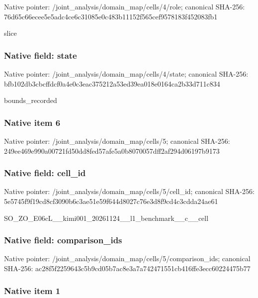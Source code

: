 \documentclass[10pt,a4paper]{article}
\begin{document}
Native pointer: /joint\_analysis/domain\_map/cells/4/role; canonical SHA-256: 76d65c66ecee5e5adc4ce6c3\allowbreak{}1085e0c483b11152f565cef9\allowbreak{}578183f452083fb1


slice


\subsubsection{Native field: state}


Native pointer: /joint\_analysis/domain\_m\allowbreak{}ap/cells/4/state; canonical SHA-256: bfb102db3cbcffdcf0a4e0c3\allowbreak{}eac375212a53ed39ea018e01\allowbreak{}64ca2b33d711c834


bounds\_recorded


\subsubsection{Native item 6}


Native pointer: /joint\_analysis/domain\_map/cells/5; canonical SHA-256: 249ee469e990a00721fd50dd\allowbreak{}8fed57afe5a0b8070057dff2\allowbreak{}af294d06197b9173



\subsubsection{Native field: cell\_id}


Native pointer: /joint\_analysis/domain\_m\allowbreak{}ap/cells/5/cell\_id; canonical SHA-256: 5e5745f9f19cd8cf3090b6c3\allowbreak{}ae51e59f644d8027c76e3d8f\allowbreak{}9cd4c3cdda24ae61


SO\_ZO\_E06cL\_\_kimi001\_202\allowbreak{}61124\_\_l1\_benchmark\_\_c\_\_\allowbreak{}cell


\subsubsection{Native field: comparison\_ids}


Native pointer: /joint\_analysis/domain\_m\allowbreak{}ap/cells/5/comparison\_id\allowbreak{}s; canonical SHA-256: ac28f5f2259643c5b9cd05b7\allowbreak{}ac8e3a7a742471551cb416ff\allowbreak{}e3ecc60224475b77



\subsubsection{Native item 1}
\end{document}
